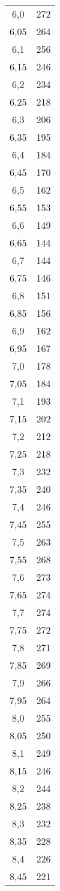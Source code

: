 \begin{longtable}{cc}
6,0  & 272\\
6,05 & 264\\
6,1  & 256\\
6,15 & 246\\
6,2  & 234\\
6,25 & 218\\
6,3  & 206\\
6,35 & 195\\
6,4  & 184\\
6,45 & 170\\
6,5  & 162\\
6,55 & 153\\
6,6  & 149\\
6,65 & 144\\
6,7  & 144\\
6,75 & 146\\
6,8  & 151\\
6,85 & 156\\
6,9  & 162\\
6,95 & 167\\
7,0  & 178\\
7,05 & 184\\
7,1  & 193\\
7,15 & 202\\
7,2  & 212\\
7,25 & 218\\
7,3  & 232\\
7,35 & 240\\
7,4  & 246\\
7,45 & 255\\
7,5  & 263\\
7,55 & 268\\
7,6  & 273\\
7,65 & 274\\
7,7  & 274\\
7,75 & 272\\
7,8  & 271\\
7,85 & 269\\
7,9  & 266\\
7,95 & 264\\
8,0  & 255\\
8,05 & 250\\
8,1  & 249\\
8,15 & 246\\
8,2  & 244\\
8,25 & 238\\
8,3  & 232\\
8,35 & 228\\
8,4  & 226\\
8,45 & 221\\

\end{longtable}
